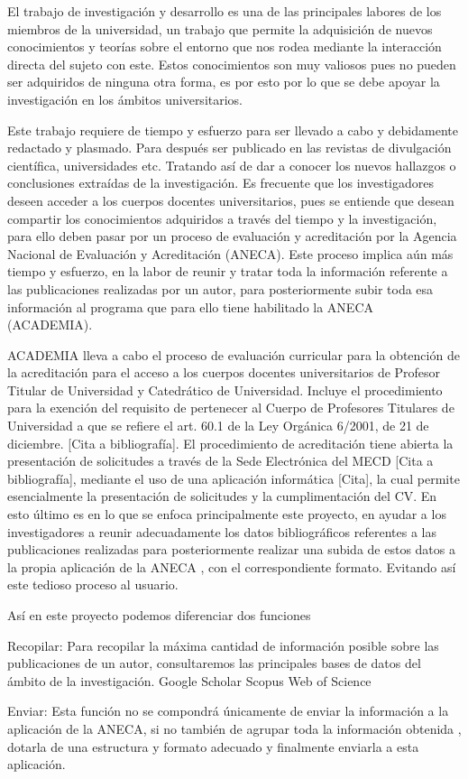 
El trabajo de investigación y desarrollo es una de las principales labores de los miembros de la universidad, un trabajo que permite la adquisición de nuevos conocimientos y teorías sobre el entorno que nos rodea mediante la interacción directa del sujeto con este. Estos conocimientos son muy valiosos pues no pueden ser adquiridos de ninguna otra forma, es por esto por lo que se debe apoyar la investigación en los ámbitos universitarios.

Este trabajo requiere de tiempo y esfuerzo para ser llevado a cabo y debidamente redactado y plasmado. Para después ser publicado en las revistas de divulgación científica, universidades etc. Tratando así de dar a conocer los nuevos hallazgos o conclusiones extraídas de la investigación. Es frecuente que los investigadores deseen acceder a los cuerpos docentes universitarios, pues se entiende que desean compartir los conocimientos adquiridos a través del tiempo y la investigación, para ello deben pasar por un proceso de evaluación y acreditación por la Agencia Nacional de Evaluación y Acreditación (ANECA). Este proceso implica aún más tiempo y esfuerzo, en la labor de reunir y tratar toda la información referente a las publicaciones realizadas por un autor, para posteriormente subir toda esa información al programa que para ello tiene habilitado la ANECA (ACADEMIA).

ACADEMIA lleva a cabo el proceso de evaluación curricular para la obtención de la acreditación para el acceso a los cuerpos docentes universitarios de Profesor Titular de Universidad y Catedrático de Universidad.
Incluye el procedimiento para la exención del requisito de pertenecer al Cuerpo de Profesores Titulares de Universidad a que se refiere el art. 60.1 de la Ley Orgánica 6/2001, de 21 de diciembre. [Cita a bibliografía]. El procedimiento de acreditación tiene abierta la presentación de solicitudes a través de la Sede Electrónica del MECD [Cita a bibliografía], mediante el uso de una aplicación informática [Cita], la cual permite esencialmente la presentación de solicitudes y la cumplimentación del CV.
En esto último es en lo que se enfoca principalmente este proyecto, en ayudar a los investigadores a reunir adecuadamente los datos bibliográficos referentes a las publicaciones realizadas para posteriormente realizar una subida de estos datos a la propia aplicación de la ANECA , con el correspondiente formato. Evitando así este tedioso proceso al usuario.

Así en este proyecto podemos diferenciar dos funciones 
	
	Recopilar: Para recopilar la máxima cantidad de información posible sobre las publicaciones de un autor, consultaremos las principales bases de datos del ámbito de la investigación.
		Google Scholar
		Scopus
		Web of Science

	Enviar: Esta función no se compondrá únicamente de enviar la información a la aplicación de la ANECA, si no también de agrupar toda la información obtenida , dotarla de una estructura y formato adecuado y finalmente enviarla a esta aplicación.
	

